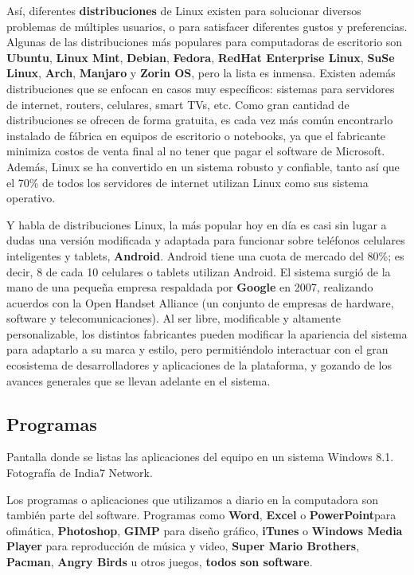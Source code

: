 Así, diferentes \textbf{distribuciones} de Linux existen para solucionar
diversos problemas de múltiples usuarios, o para satisfacer diferentes gustos y
preferencias. Algunas de las distribuciones más populares para computadoras de
escritorio son \textbf{Ubuntu}, \textbf{Linux Mint}, \textbf{Debian},
\textbf{Fedora}, \textbf{RedHat Enterprise Linux}, \textbf{SuSe Linux},
\textbf{Arch}, \textbf{Manjaro} y \textbf{Zorin OS}, pero la lista es inmensa.
Existen además distribuciones que se enfocan en casos muy específicos: sistemas
para servidores de internet, routers, celulares, smart TVs, etc. Como gran
cantidad de distribuciones se ofrecen de forma gratuita, es cada vez más común
encontrarlo instalado de fábrica en equipos de escritorio o notebooks, ya que el
fabricante minimiza costos de venta final al no tener que pagar el software de
Microsoft. Además, Linux se ha convertido en un sistema robusto y confiable,
tanto así que el 70\% de todos los servidores de internet utilizan Linux como
sus sistema operativo.

Y habla de distribuciones Linux, la más popular hoy en día es casi sin lugar a
dudas una versión modificada y adaptada para funcionar sobre teléfonos celulares
inteligentes y tablets, \textbf{Android}. Android tiene una cuota de mercado del
80\%; es decir, 8 de cada 10 celulares o tablets utilizan Android. El sistema
surgió de la mano de una pequeña empresa respaldada por \textbf{Google} en 2007,
realizando acuerdos con la Open Handset Alliance (un conjunto de empresas de
hardware, software y telecomunicaciones). Al ser libre, modificable y altamente
personalizable, los distintos fabricantes pueden modificar la apariencia del
sistema para adaptarlo a su marca y estilo, pero permitiéndolo interactuar con
el gran ecosistema de desarrolladores y aplicaciones de la plataforma, y gozando
de los avances generales que se llevan adelante en el sistema.

\subsection{Programas}
\label{chap:computadoras:subsec:programas}

{Pantalla donde se listas las aplicaciones del equipo en un sistema Windows
8.1.} {Fotografía de India7 Network.}

Los programas o aplicaciones que utilizamos a diario en la computadora son
también parte del software. Programas como \textbf{Word}, \textbf{Excel} o
\textbf{PowerPoint}para ofimática, \textbf{Photoshop}, \textbf{GIMP} para diseño
gráfico, \textbf{iTunes} o \textbf{Windows Media Player} para reproducción de
música y video, \textbf{Super Mario Brothers}, \textbf{Pacman}, \textbf{Angry
Birds} u otros juegos, \textbf{todos son software}.

